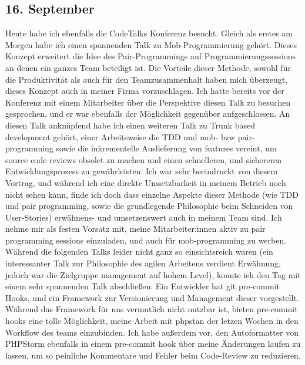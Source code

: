 \subsection{16. September}
Heute habe ich ebenfalls die CodeTalks Konferenz besucht. Gleich als erstes am Morgen habe ich einen spannenden Talk zu Mob-Programmierung gehört. Dieses Konzept erweitert die Idee des Pair-Programmings auf Programmierungssessions an denen ein ganzes Team beteiligt ist. Die Vorteile dieser Methode, sowohl für die Produktivität als auch für den Teamzusammenhalt haben mich überzeugt, dieses Konzept auch in meiner Firma vorzuschlagen. Ich hatte bereits vor der Konferenz mit einem Mitarbeiter über die Perspektive diesen Talk zu besuchen gesprochen, und er war ebenfalls der Möglichkeit gegenüber aufgeschlossen. An diesen Talk anknüpfend habe ich einen weiteren Talk zu Trunk based development gehört, einer Arbeitsweise die TDD und mob- bzw pair-programming sowie die inkrementelle Auslieferung von features vereint, um source code reviews obsolet zu machen und einen schnelleren, und sichereren Entwicklungsprozess zu gewährleisten. Ich war sehr beeindruckt von diesem Vortrag, und während ich eine direkte Umsetzbarkeit in meinem Betrieb noch nicht sehen kann, finde ich doch dass einzelne Aspekte dieser Methode (wie TDD und pair programming, sowie die grundlegende Philosophie beim Schneiden von User-Stories) erwähnens- und umsetzenswert auch in meinem Team sind. Ich nehme mir als festen Vorsatz mit, meine Mitarbeiter:innen aktiv zu pair programming sessions einzuladen, und auch für mob-programming zu werben. Während die folgenden Talks leider nicht ganz so einsichtsreich waren (ein interessanter Talk zur Philosophie des agilen Arbeitens verdient Erwähnung, jedoch war die Zielgruppe management auf hohem Level), konnte ich den Tag mit einem sehr spannenden Talk abschließen: Ein Entwickler hat git pre-commit Hooks, und ein Framework zur Versionierung und Management dieser vorgestellt. Während das Framework für uns vermutlich nicht nutzbar ist, bieten pre-commit hooks eine tolle Möglichkeit, meine Arbeit mit phpstan der letzen Wochen in den Workflow des teams einzubinden. Ich habe außerdem vor, den Autoformatter von PHPStorm ebenfalls in einem pre-commit hook über meine Änderungen laufen zu lassen, um so peinliche Kommentare und Fehler beim Code-Review zu reduzieren.